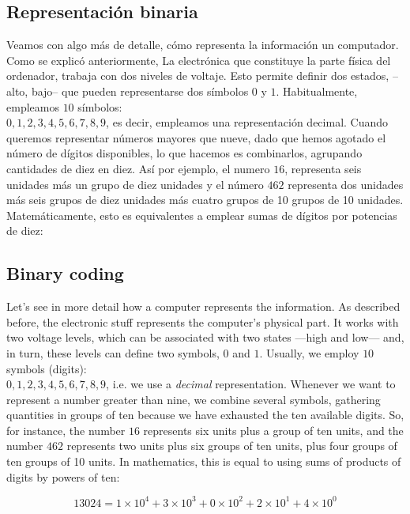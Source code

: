 \begin{paracol}{2}
\subsection{Representación binaria} 
Veamos con algo más de detalle, cómo representa la información un computador. Como se explicó anteriormente, La electrónica que constituye la parte física del ordenador, trabaja con dos niveles de voltaje. Esto permite definir dos estados, --alto, bajo-- que pueden representarse dos símbolos  $0$ y $1$. Habitualmente, empleamos $10$ símbolos: \\${0,1,2,3,4,5,6,7,8,9}$, es decir, empleamos una representación decimal. Cuando queremos representar números mayores que nueve, dado que hemos agotado el número de dígitos disponibles, lo que hacemos es combinarlos, agrupando cantidades de diez en diez. Así por ejemplo, el numero $16$, representa seis unidades más un grupo de diez unidades y el número $462$ representa dos unidades más seis grupos de diez unidades más cuatro grupos de 10 grupos de 10 unidades.  Matemáticamente, esto es equivalentes a emplear sumas de dígitos por potencias de diez:
\switchcolumn
\subsection{Binary coding} 

Let's see in more detail how a computer represents the information. As described before, the electronic stuff represents the computer's physical part. It works with two voltage levels, which can be associated with two states ---high and low--- and, in turn, these levels can define two symbols, $0$ and $1$. Usually, we employ $10$ symbols (digits):\\ ${0,1,2,3,4,5,6,7,8,9}$, i.e. we use a \emph{decimal} representation. Whenever we want to represent a number greater than nine, we combine several symbols, gathering quantities in groups of ten because we have exhausted the ten available digits. So, for instance,  the number $16$ represents six units plus a group of ten units, and the number $462$ represents two units plus six groups of ten units, plus four groups of ten groups of 10 units. In mathematics, this is equal to using sums of products of digits by powers of ten:       

\end{paracol}
\begin{equation*}
13024 = 1\times10^4+3\times10^3+0\times10^2+2\times10^1+4\times10^0 
\end{equation*}

